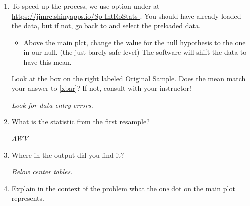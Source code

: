 \begin{enumerate}
\begin{enumerate}
\begin{key}
  {\it 0.15, because this is the null value. }
\end{key}


\end{enumerate}
\item To speed up the process, we use   option under
   at  \url{https://jimrc.shinyapps.io/Sp-IntRoStats
  }. You should have already loaded the data, but if not, go back to
   and select the preloaded 
  data. 

  \begin{itemize}
    \item Above the main plot, change the value for the null
      hypothesis to the one in our null.  (the just barely safe level)
      The software will shift the data to have this mean.
   \end{itemize}

    Look at the box on the right labeled {\sf Original Sample}.
       Does the mean match your answer to \ref{xbar}?  If not, consult
       with your instructor! 
\begin{students}
  \vspace{1cm}
\end{students}

\begin{key}
  {\it Look for data entry errors. }
\end{key}

\item   What is the statistic from the first  resample?
\begin{students}
  \vspace{1cm}
\end{students}

\begin{key}
  {\it AWV}
\end{key}

\item Where in the  output did you find it?
\begin{students}
  \vspace{1cm}
\end{students}

\begin{key}
  {\it Below center tables.}
\end{key}


\item Explain in the context of the problem what the one dot on the
  main plot represents. 
\begin{students}
  \vspace{1cm}
\end{students}


\end{enumerate}
